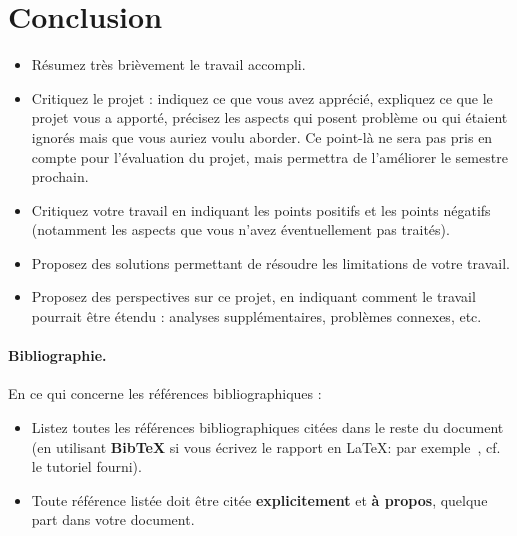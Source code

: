 \documentclass{ceri/sty/rapport}
\begin{document}
\section{Conclusion}
\begin{itemize}
	\item Résumez très brièvement le travail accompli.
	\item Critiquez le projet : indiquez ce que vous avez apprécié, expliquez ce que le projet vous a apporté, précisez les aspects qui posent problème ou qui étaient ignorés mais que vous auriez voulu aborder. Ce point-là ne sera pas pris en compte pour l'évaluation du projet, mais permettra de l'améliorer le semestre prochain.
	\item Critiquez votre travail en indiquant les points positifs et les points négatifs (notamment les aspects que vous n'avez éventuellement pas traités).
	\item Proposez des solutions permettant de résoudre les limitations de votre travail.
	\item Proposez des perspectives sur ce projet, en indiquant comment le travail pourrait être étendu : analyses supplémentaires, problèmes connexes, etc.
\end{itemize}

\paragraph{Bibliographie.} En ce qui concerne les références bibliographiques :
\begin{itemize}
	\item Listez toutes les références bibliographiques citées dans le reste du document (en utilisant \textbf{BibTeX} si vous écrivez le rapport en \LaTeX{}: par exemple~\cite{Wei1989}, cf. le tutoriel fourni).
	\item Toute référence listée doit être citée \textbf{explicitement} et \textbf{à propos}, quelque part dans votre document.
\end{itemize}













 
 
  
  
\MyBibliography
\end{document}
